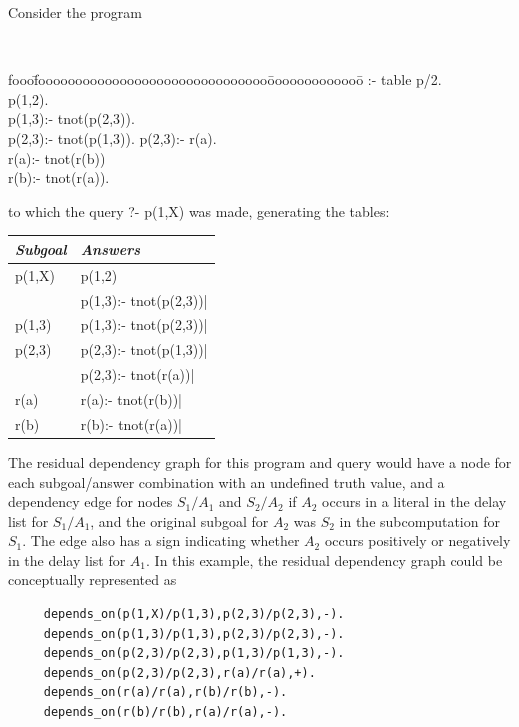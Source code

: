 \begin{example}\label{ex:rdg} \rm 
Consider the program 
% 
{\tt 
\begin{tabbing}
fooo\=fooooooooooooooooooooooooooooooo\=ooooooooooooo\=\kill
 \>  :- table p/2. \\
\>           p(1,2). \\
\>           p(1,3):- tnot(p(2,3)).  \\
\>           p(2,3):- tnot(p(1,3)). \> p(2,3):- r(a).\\
\>           r(a):- tnot(r(b)) \\
\>           r(b):- tnot(r(a)).   
\end{tabbing}
}
%
to which the query {?- p(1,X)} was made, generating the tables:
\begin{center}
\begin{tabular}{||l|l||}   \hline
     {\em Subgoal}                 & {\em Answers} \\ \hline \hline
     p(1,X)                     & p(1,2) \\ 
                                & p(1,3):- tnot(p(2,3))| \\ \hline
     p(1,3)                     & p(1,3):- tnot(p(2,3))| \\ \hline
     p(2,3)                     & p(2,3):- tnot(p(1,3))| \\ \hline
                                & p(2,3):- tnot(r(a))| \\ \hline
     r(a)                       & r(a):- tnot(r(b))| \\ \hline
     r(b)                       & r(b):- tnot(r(a))| \\ \hline
\end{tabular}
\end{center}

The residual dependency graph for this program and query would have a
node for each subgoal/answer combination with an undefined truth
value, and a dependency edge for nodes $S_1/A_1$ and $S_2/A_2$ if
$A_2$ occurs in a literal in the delay list for $S_1/A_1$, and the
original subgoal for $A_2$ was $S_2$ in the subcomputation for $S_1$.
The edge also has a sign indicating whether $A_2$ occurs positively or
negatively in the delay list for $A_1$.  In this example, the residual
dependency graph could be conceptually represented as 
%
\begin{verbatim}
     depends_on(p(1,X)/p(1,3),p(2,3)/p(2,3),-).
     depends_on(p(1,3)/p(1,3),p(2,3)/p(2,3),-).
     depends_on(p(2,3)/p(2,3),p(1,3)/p(1,3),-).
     depends_on(p(2,3)/p(2,3),r(a)/r(a),+).
     depends_on(r(a)/r(a),r(b)/r(b),-).
     depends_on(r(b)/r(b),r(a)/r(a),-).
\end{verbatim}
\end{example}

